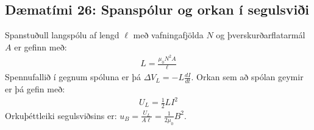 \newpage


\subsection*{Dæmatími 26: Spanspólur og orkan í segulsviði}

\begin{tcolorbox}
Spanstuðull langspólu af lengd $\ell$ með vafningafjölda $N$ og þverskurðarflatarmál $A$ er gefinn með:
\begin{align*}
    L = \frac{\mu_0 N^2 A}{\ell}
\end{align*}
Spennufallið í gegnum spóluna er þá $\Delta V_L = - L \frac{dI}{dt}$. Orkan sem að spólan geymir er þá gefin með:
\begin{align*}
    U_L = \frac{1}{2}LI^2
\end{align*}
Orkuþéttleiki segulsviðsins er: $u_B = \frac{U_L}{A\ell} = \frac{1}{2\mu_0}B^2$.
\end{tcolorbox}


